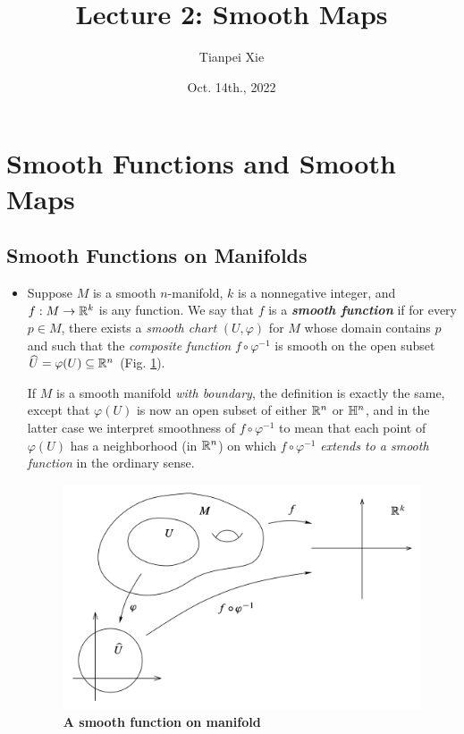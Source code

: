 \documentclass[11pt]{article}
\begin{document}
\title{Lecture 2: Smooth Maps}
\author{ Tianpei Xie}
\date{Oct. 14th., 2022}
\maketitle
\tableofcontents
\newpage
\section{Smooth Functions and Smooth Maps}
\subsection{Smooth Functions on Manifolds}
\begin{itemize}
\item 
\begin{definition}
Suppose $M$ is a smooth $n$-manifold, $k$ is a nonnegative integer, and $f: M \rightarrow {\mathbb R}^k$ is any function. We say that $f$ is a \emph{\textbf{smooth function}} if for every $p \in M$, there exists a \emph{smooth chart} $(U, \varphi)$ for $M$ whose domain contains $p$ and such that the \emph{composite function} $f \circ \varphi^{-1}$ is smooth on the open subset $\widehat{U} = \varphi(U) \subseteq {\mathbb R}^n$ (Fig. \ref{fig: smooth_fun}).

If $M$ is a smooth manifold \emph{with boundary}, the definition is exactly the same, except that $\varphi(U)$ is now an open subset of either 
${\mathbb R}^n$ or ${\mathbb H}^n$, and in the latter case we interpret smoothness of $f \circ \varphi^{-1}$ to mean that each point of $\varphi(U)$ has a neighborhood (in ${\mathbb R}^n$) on which $f \circ \varphi^{-1}$ \emph{extends to a smooth function} in the ordinary sense.
\end{definition}


\begin{figure}
\begin{minipage}[t]{1\linewidth}
  \centering
  \centerline{\includegraphics[scale = 0.5]{smooth_map.png}}
\end{minipage}
\caption{\footnotesize{\textbf{A smooth function on manifold \citep{lee2003introduction}}}}
\label{fig: smooth_fun}
\end{figure}


\end{itemize}
\end{document}
